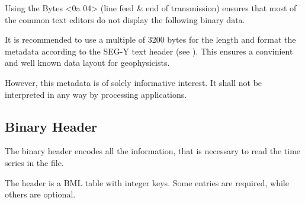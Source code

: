 \documentclass[DIV=10]{scrartcl}
\newcommand\litref[1]{\textref{[#1]}}
\begin{document}
Using the Bytes <0a 04> (line feed \& end of transmission) ensures that most of the common text editors do not display the following binary data.

It is recommended to use a multiple of 3200 bytes for the length and format the metadata according to the SEG-Y text header (see \litref{Segy02}).
This ensures a convinient and well known data layout for geophysicists.

However, this metadata is of solely informative interest.
It shall not be interpreted in any way by processing applications.

\subsection{Binary Header}

The binary header encodes all the information, that is necessary to read the time series in the file.

The header is a BML table with integer keys.
Some entries are required, while others are optional.
\end{document}
